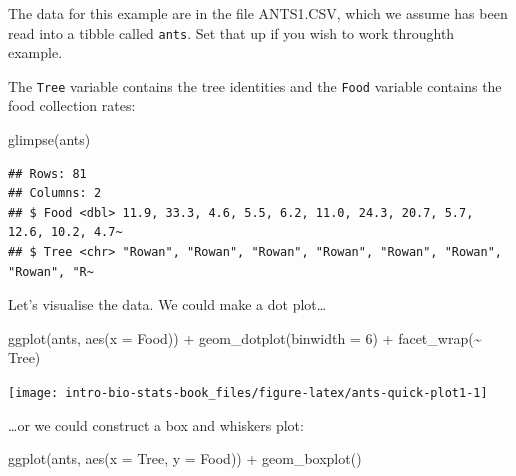 \documentclass[
]{book}
\newenvironment{Shaded}{\begin{snugshade}}{\end{snugshade}}
\newcommand{\AttributeTok}[1]{\textcolor[rgb]{0.77,0.63,0.00}{#1}}
\newcommand{\DecValTok}[1]{\textcolor[rgb]{0.00,0.00,0.81}{#1}}
\newcommand{\FunctionTok}[1]{\textcolor[rgb]{0.00,0.00,0.00}{#1}}
\newcommand{\NormalTok}[1]{#1}
\newcommand{\SpecialCharTok}[1]{\textcolor[rgb]{0.00,0.00,0.00}{#1}}
\newenvironment{greybox}{
  \definecolor{shadecolor}{rgb}{0.95,0.95,0.95}  %
  \color{black}
  \begin{shaded}}
 {\end{shaded}}
\newenvironment{infobox}[1]
  {
  \begin{itemize}
  \renewcommand{\labelitemi}{
    \raisebox{-.7\height}[0pt][0pt]{
      {\setkeys{Gin}{width=3em,keepaspectratio}
        \texttt{[image: images/\#1]}}
    }
  }
  \setlength{\fboxsep}{1em}
  \begin{greybox}
  \item
  }
  {
  \end{greybox}
  \end{itemize}
  }
\begin{document}
\begin{infobox}{action}

\hypertarget{section-15}{%
\subsubsection*{}\label{section-15}}

The data for this example are in the file ANTS1.CSV, which we assume has been read into a tibble called \texttt{ants}. Set that up if you wish to work throughth example.

\end{infobox}

The \texttt{Tree} variable contains the tree identities and the \texttt{Food} variable contains the food collection rates:

\begin{Shaded}
\begin{Highlighting}[]
\FunctionTok{glimpse}\NormalTok{(ants)}
\end{Highlighting}
\end{Shaded}

\begin{verbatim}
## Rows: 81
## Columns: 2
## $ Food <dbl> 11.9, 33.3, 4.6, 5.5, 6.2, 11.0, 24.3, 20.7, 5.7, 12.6, 10.2, 4.7~
## $ Tree <chr> "Rowan", "Rowan", "Rowan", "Rowan", "Rowan", "Rowan", "Rowan", "R~
\end{verbatim}

Let's visualise the data. We could make a dot plot\ldots{}

\begin{Shaded}
\begin{Highlighting}[]
\FunctionTok{ggplot}\NormalTok{(ants, }\FunctionTok{aes}\NormalTok{(}\AttributeTok{x =}\NormalTok{ Food)) }\SpecialCharTok{+} 
  \FunctionTok{geom\_dotplot}\NormalTok{(}\AttributeTok{binwidth =} \DecValTok{6}\NormalTok{) }\SpecialCharTok{+} \FunctionTok{facet\_wrap}\NormalTok{(}\SpecialCharTok{\textasciitilde{}}\NormalTok{ Tree)}
\end{Highlighting}
\end{Shaded}

\begin{center}\texttt{[image: intro-bio-stats-book\_files/figure-latex/ants-quick-plot1-1]} \end{center}

\ldots or we could construct a box and whiskers plot:

\begin{Shaded}
\begin{Highlighting}[]
\FunctionTok{ggplot}\NormalTok{(ants, }\FunctionTok{aes}\NormalTok{(}\AttributeTok{x =}\NormalTok{ Tree, }\AttributeTok{y =}\NormalTok{ Food)) }\SpecialCharTok{+} 
  \FunctionTok{geom\_boxplot}\NormalTok{()}
\end{Highlighting}
\end{Shaded}
\end{document}
